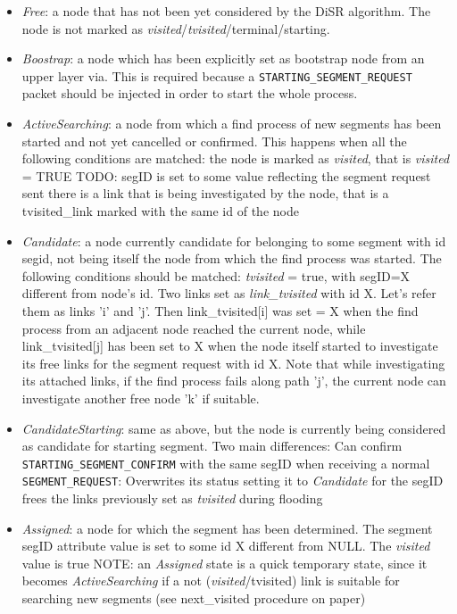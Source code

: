 \begin{itemize}
\item{\emph{Free}}: a node that has  not been yet considered  by the DiSR algorithm.
The node is not marked as \emph{visited}/\emph{tvisited}/terminal/starting.
\item{\emph{Boostrap}}: a node which has been explicitly set as bootstrap node from
an upper layer via. This is required because a
\texttt{STARTING\_SEGMENT\_REQUEST} packet should be injected in order to start
the whole process.
\item{\emph{ActiveSearching}}: a node from which a find process of new segments has
been started and not yet cancelled or confirmed. This happens when all
the following conditions are matched: the node is marked as \emph{visited},
that is \emph{visited} = TRUE 
TODO: segID is set to some value reflecting
the segment request sent there is a link that is being investigated by
the node, that is a tvisited\_link marked with the same id of the node 
\item{\emph{Candidate}}: a node currently candidate for belonging to some segment
with id segid, not being itself the node from which the find process
was started. The following conditions should be matched: \emph{tvisited} =
true, with segID=X different from node's id.  Two links set as
\emph{link\_tvisited} with id X. Let’s refer them as  links 'i' and 'j'. Then
link\_tvisited[i] was set = X when the find process from an adjacent
node reached the current node, while link\_tvisited[j] has been set to
X when the node itself started to investigate its free links for the
segment request with id X. Note that while investigating its attached
links, if the find process fails along path 'j', the current node can
investigate another free node 'k' if suitable.  
\item{\emph{CandidateStarting}}: same as above, but the node is currently being considered as candidate
for starting segment. Two main differences: Can confirm
\texttt{STARTING\_SEGMENT\_CONFIRM} with the same segID when receiving a normal
\texttt{SEGMENT\_REQUEST}: Overwrites its status setting it to \emph{Candidate} for the
segID frees the links previously set as \emph{tvisited} during flooding
\item{\emph{Assigned}}: a node for which the segment has been determined.  The
segment segID attribute value is set to some id X different from NULL.
The \emph{visited} value is true NOTE: an \emph{Assigned} state is a quick temporary
state, since it becomes \emph{ActiveSearching} if a not (\emph{visited}/tvisited)
link is suitable for searching new segments (see next\_visited
procedure on paper) 
\end{itemize}



